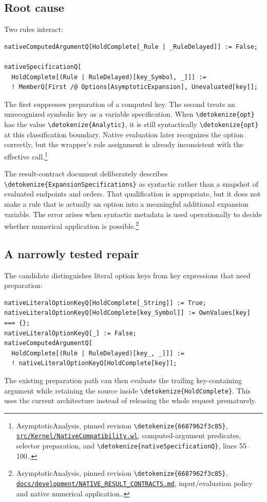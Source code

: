 \documentclass[11pt]{article}
\newcommand{\code}[1]{{\ttfamily\expandafter\nolinkurl\expandafter{\detokenize{#1}}}}
\newcommand{\repo}{https://github.com/VladimirReshetnikov/Asymptotic/blob/6687962f3c858a4f93623cfc496f33e35c6763d4/}
\newcommand{\src}[2]{\footnote{AsymptoticAnalysis, pinned revision \code{6687962f3c85}, \href{\repo#1}{\nolinkurl{#1}}, #2.}}
\begin{document}
\subsection{Root cause}
Two rules interact:
\begin{lstlisting}
nativeComputedArgumentQ[HoldComplete[_Rule | _RuleDelayed]] := False;

nativeSpecificationQ[
  HoldComplete[(Rule | RuleDelayed)[key_Symbol, _]]] :=
  ! MemberQ[First /@ Options[AsymptoticExpansion], Unevaluated[key]];
\end{lstlisting}
The first suppresses preparation of a computed key. The second treats an unrecognized symbolic key as a variable specification. When \code{opt} has the value \code{Analytic}, it is still syntactically \code{opt} at this classification boundary. Native evaluation later recognizes the option correctly, but the wrapper's role assignment is already inconsistent with the effective call.\src{src/Kernel/NativeCompatibility.wl}{computed-argument predicates, selector preparation, and \code{nativeSpecificationQ}, lines 55--100.}

The result-contract document deliberately describes \code{ExpansionSpecifications} as syntactic rather than a snapshot of evaluated endpoints and orders. That qualification is appropriate, but it does not make a rule that is actually an option into a meaningful additional expansion variable. The error arises when syntactic metadata is used operationally to decide whether numerical application is possible.\src{docs/development/NATIVE_RESULT_CONTRACTS.md}{input/evaluation policy and native numerical application.}

\subsection{A narrowly tested repair}
The candidate distinguishes literal option keys from key expressions that need preparation:
\begin{lstlisting}
nativeLiteralOptionKeyQ[HoldComplete[_String]] := True;
nativeLiteralOptionKeyQ[HoldComplete[key_Symbol]] := OwnValues[key] === {};
nativeLiteralOptionKeyQ[_] := False;
nativeComputedArgumentQ[
  HoldComplete[(Rule | RuleDelayed)[key_, _]]] :=
  ! nativeLiteralOptionKeyQ[HoldComplete[key]];
\end{lstlisting}
The existing preparation path can then evaluate the trailing key-containing argument while retaining the source inside \code{HoldComplete}. This uses the current architecture instead of releasing the whole request prematurely.
\end{document}
